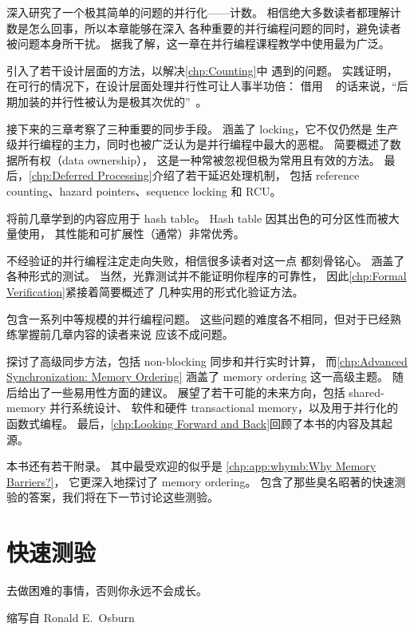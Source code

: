 深入研究了一个极其简单的问题的并行化——计数。
相信绝大多数读者都理解计数是怎么回事，所以本章能够在深入
各种重要的并行编程问题的同时，避免读者被问题本身所干扰。
据我了解，这一章在并行编程课程教学中使用最为广泛。

引入了若干设计层面的方法，以解决\cref{chp:Counting}中
遇到的问题。
实践证明，在可行的情况下，在设计层面处理并行性可让人事半功倍：
借用 ~\cite{Dijkstra:1968:LEG:362929.362947}
的话来说，``后期加装的并行性被认为是极其次优的''~\cite{PaulEMcKenney2012HOTPARsuboptimal}。

接下来的三章考察了三种重要的同步手段。
涵盖了 locking，它不仅仍然是
生产级并行编程的主力，同时也被广泛认为是并行编程中最大的恶棍。
简要概述了数据所有权（data ownership），
这是一种常被忽视但极为常用且有效的方法。
最后，\cref{chp:Deferred Processing}介绍了若干延迟处理机制，
包括 reference counting、hazard pointers、sequence locking 和 RCU\@。

将前几章学到的内容应用于 hash table。
Hash table 因其出色的可分区性而被大量使用，
其性能和可扩展性（通常）非常优秀。

不经验证的并行编程注定走向失败，相信很多读者对这一点
都刻骨铭心。
涵盖了各种形式的测试。
当然，光靠测试并不能证明你程序的可靠性，
因此\cref{chp:Formal Verification}紧接着简要概述了
几种实用的形式化验证方法。

包含一系列中等规模的并行编程问题。
这些问题的难度各不相同，但对于已经熟练掌握前几章内容的读者来说
应该不成问题。

探讨了高级同步方法，包括
non-blocking 同步和并行实时计算，
而\cref{chp:Advanced Synchronization: Memory Ordering}
涵盖了 memory ordering 这一高级主题。
随后给出了一些易用性方面的建议。
展望了若干可能的未来方向，包括 shared-memory 并行系统设计、
软件和硬件 transactional memory，以及用于并行化的函数式编程。
最后，\cref{chp:Looking Forward and Back}回顾了本书的内容及其起源。

本书还有若干附录。
其中最受欢迎的似乎是
\cref{chp:app:whymb:Why Memory Barriers?}，
它更深入地探讨了 memory ordering。
包含了那些臭名昭著的快速测验的答案，我们将在下一节讨论这些测验。

\section{快速测验}
\label{sec:howto:Quick Quizzes}
%
\epigraph{去做困难的事情，否则你永远不会成长。}
	 {缩写自 Ronald E.~Osburn}

